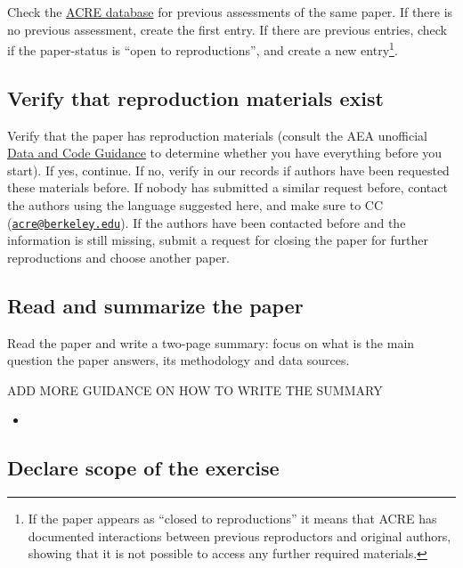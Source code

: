 \documentclass[]{book}
\begin{document}
Check the \href{ADD\%20LINK}{ACRE database} for previous assessments of the same paper. If there is no previous assessment, create the first entry. If there are previous entries, check if the paper-status is ``open to reproductions'', and create a new entry\footnote{If the paper appears as ``closed to reproductions'' it means that ACRE has documented interactions between previous reproductors and original authors, showing that it is not possible to access any further required materials. }.

\hypertarget{verify-rep-mat}{%
\subsection{Verify that reproduction materials exist}\label{verify-rep-mat}}

Verify that the paper has reproduction materials (consult the AEA unofficial \href{https://social-science-data-editors.github.io/guidance/Verification_guidance.html}{Data and Code Guidance} to determine whether you have everything before you start). If yes, continue. If no, verify in our records if authors have been requested these materials before. If nobody has submitted a similar request before, contact the authors using the language suggested here, and make sure to CC (\href{mailto:acre@berkeley.edu}{\nolinkurl{acre@berkeley.edu}}). If the authors have been contacted before and the information is still missing, submit a request for closing the paper for further reproductions and choose another paper.

\hypertarget{read-sum}{%
\subsection{Read and summarize the paper}\label{read-sum}}

Read the paper and write a two-page summary: focus on what is the main question the paper answers, its methodology and data sources.

ADD MORE GUIDANCE ON HOW TO WRITE THE SUMMARY

\begin{itemize}
\item
\end{itemize}

\hypertarget{declare-scope-of-the-exercise}{%
\subsection{Declare scope of the exercise}\label{declare-scope-of-the-exercise}}
\end{document}
